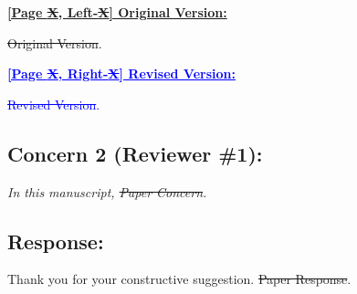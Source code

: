 \begin{tcolorbox}[colframe=black,colback=white,arc=0mm,boxrule=0.5mm, left=1mm, right=1mm, top=1mm, bottom=1mm, use color stack,breakable]

  \noindent \textbf{\underline{[Page \sout{X}, Left-\sout{X}] Original Version:}}

  \vspace{1mm}

  \noindent
  \sout{Original Version}.

  \hrulefill
  \vspace{1mm}

  \noindent \textbf{\textcolor{blue}{\underline{[Page \sout{X}, Right-\sout{X}] Revised Version:}}}

  \vspace{1mm}

  \noindent
  \textcolor{blue}{
    \sout{Revised Version}.
  }

\end{tcolorbox}

{}
\subsection*{Concern 2 (Reviewer \#1):}
\textit{In this manuscript, \sout{Paper Concern}.}

\subsection*{Response:}
Thank you for your constructive suggestion.
\sout{Paper Response}.

